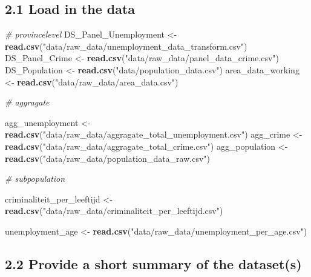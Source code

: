 \documentclass[
]{article}
\newenvironment{Shaded}{\begin{snugshade}}{\end{snugshade}}
\newcommand{\CommentTok}[1]{\textcolor[rgb]{0.56,0.35,0.01}{\textit{#1}}}
\newcommand{\FunctionTok}[1]{\textcolor[rgb]{0.13,0.29,0.53}{\textbf{#1}}}
\newcommand{\NormalTok}[1]{#1}
\newcommand{\OtherTok}[1]{\textcolor[rgb]{0.56,0.35,0.01}{#1}}
\newcommand{\StringTok}[1]{\textcolor[rgb]{0.31,0.60,0.02}{#1}}
\begin{document}
\subsection{2.1 Load in the data}\label{load-in-the-data}

\begin{Shaded}
\begin{Highlighting}[]
\CommentTok{\# provincelevel}
\NormalTok{DS\_Panel\_Unemployment }\OtherTok{\textless{}{-}} \FunctionTok{read.csv}\NormalTok{(}\StringTok{"data/raw\_data/unemployment\_data\_transform.csv"}\NormalTok{)}
\NormalTok{DS\_Panel\_Crime }\OtherTok{\textless{}{-}} \FunctionTok{read.csv}\NormalTok{(}\StringTok{"data/raw\_data/panel\_data\_crime.csv"}\NormalTok{)}
\NormalTok{DS\_Population }\OtherTok{\textless{}{-}} \FunctionTok{read.csv}\NormalTok{(}\StringTok{"data/population\_data.csv"}\NormalTok{)}
\NormalTok{area\_data\_working }\OtherTok{\textless{}{-}} \FunctionTok{read.csv}\NormalTok{(}\StringTok{"data/raw\_data/area\_data.csv"}\NormalTok{)}

\CommentTok{\# aggragate}

\NormalTok{agg\_unemployment }\OtherTok{\textless{}{-}} \FunctionTok{read.csv}\NormalTok{(}\StringTok{"data/raw\_data/aggragate\_total\_unemployment.csv"}\NormalTok{)}
\NormalTok{agg\_crime }\OtherTok{\textless{}{-}} \FunctionTok{read.csv}\NormalTok{(}\StringTok{"data/raw\_data/aggragate\_total\_crime.csv"}\NormalTok{)}
\NormalTok{agg\_population }\OtherTok{\textless{}{-}} \FunctionTok{read.csv}\NormalTok{(}\StringTok{"data/raw\_data/population\_data\_raw.csv"}\NormalTok{)}

\CommentTok{\# subpopulation}

\NormalTok{criminaliteit\_per\_leeftijd }\OtherTok{\textless{}{-}} \FunctionTok{read.csv}\NormalTok{(}\StringTok{"data/raw\_data/criminaliteit\_per\_leeftijd.csv"}\NormalTok{) }

\NormalTok{unemployment\_age }\OtherTok{\textless{}{-}} \FunctionTok{read.csv}\NormalTok{(}\StringTok{"data/raw\_data/unemployment\_per\_age.csv"}\NormalTok{) }
\end{Highlighting}
\end{Shaded}

\subsection{2.2 Provide a short summary of the
dataset(s)}\label{provide-a-short-summary-of-the-datasets}

\begin{Shaded}
\begin{Highlighting}[]

\end{Highlighting}
\end{Shaded}
\end{document}
